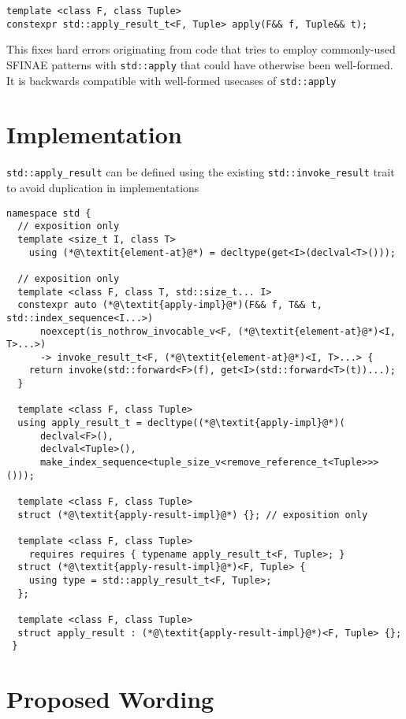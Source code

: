 \documentclass{article}
\begin{document}
\begin{lstlisting}
template <class F, class Tuple>
constexpr std::apply_result_t<F, Tuple> apply(F&& f, Tuple&& t);
\end{lstlisting}

This fixes hard errors originating from code that tries to employ commonly-used
SFINAE patterns with \texttt{std::apply} that could have otherwise been
well-formed. It is backwards compatible with well-formed usecases of
\texttt{std::apply}

\section{Implementation}
\texttt{std::apply\_result} can be defined using the existing
\texttt{std::invoke\_result} trait to avoid duplication in implementations

\begin{lstlisting}
namespace std {
  // exposition only
  template <size_t I, class T>
    using (*@\textit{element-at}@*) = decltype(get<I>(declval<T>()));

  // exposition only
  template <class F, class T, std::size_t... I>
  constexpr auto (*@\textit{apply-impl}@*)(F&& f, T&& t, std::index_sequence<I...>)
      noexcept(is_nothrow_invocable_v<F, (*@\textit{element-at}@*)<I, T>...>)
      -> invoke_result_t<F, (*@\textit{element-at}@*)<I, T>...> {
    return invoke(std::forward<F>(f), get<I>(std::forward<T>(t))...);
  }

  template <class F, class Tuple>
  using apply_result_t = decltype((*@\textit{apply-impl}@*)(
      declval<F>(),
      declval<Tuple>(),
      make_index_sequence<tuple_size_v<remove_reference_t<Tuple>>>()));

  template <class F, class Tuple>
  struct (*@\textit{apply-result-impl}@*) {}; // exposition only

  template <class F, class Tuple>
    requires requires { typename apply_result_t<F, Tuple>; }
  struct (*@\textit{apply-result-impl}@*)<F, Tuple> {
    using type = std::apply_result_t<F, Tuple>;
  };

  template <class F, class Tuple>
  struct apply_result : (*@\textit{apply-result-impl}@*)<F, Tuple> {};
 }
\end{lstlisting}

\section{Proposed Wording}
\end{document}
